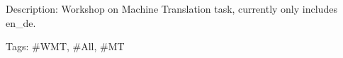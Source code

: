 Description\+: Workshop on Machine Translation task, currently only includes en\+\_\+de.

Tags\+: \#\+W\+MT, \#\+All, \#\+MT 